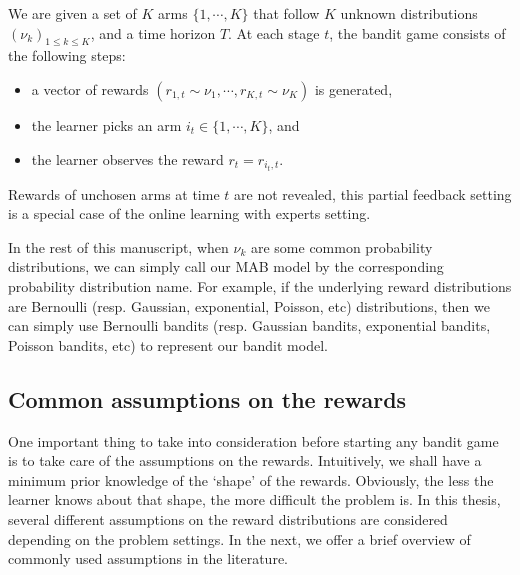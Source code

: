 \begin{definition}\label{def:mab.mab}
\begin{leftbar}[defnbar]
	We are given a set of $K$ arms $\{1,\cdots,K\}$ that follow $K$ unknown distributions $(\nu_k)_{1 \leq k \leq K}$, and a time horizon $T$. At each stage $t$, the bandit game consists of the following steps:
	\begin{itemize}
		\item a vector of rewards $(r_{1,t} \sim \nu_1, \cdots, r_{K,t} \sim \nu_K)$ is generated,
		\item the learner picks an arm $i_t \in \{1,\cdots,K\}$, and
		\item the learner observes the reward $r_t = r_{i_t, t}$.
	\end{itemize}
\end{leftbar}
\end{definition}

\begin{remark}\label{remark:mab.partial}
\begin{leftbar}[remarkbar]
	Rewards of unchosen arms at time $t$ are not revealed, this partial feedback setting is a special case of the online learning with experts setting.
\end{leftbar}
\end{remark}

In the rest of this manuscript, when $\nu_k$ are some common probability distributions, we can simply call our MAB model by the corresponding probability distribution name. For example, if the underlying reward distributions are Bernoulli (resp. Gaussian, exponential, Poisson, etc) distributions, then we can simply use Bernoulli bandits (resp. Gaussian bandits, exponential bandits, Poisson bandits, etc) to represent our bandit model. 

\subsection{Common assumptions on the rewards}\label{sec:mab.model.assumptions}

One important thing to take into consideration before starting any bandit game is to take care of the assumptions on the rewards. Intuitively, we shall have a minimum prior knowledge of the `shape' of the rewards. Obviously, the less the learner knows about that shape, the more difficult the problem is. In this thesis, several different assumptions on the reward distributions are considered depending on the problem settings. In the next, we offer a brief overview of commonly used assumptions in the literature.

